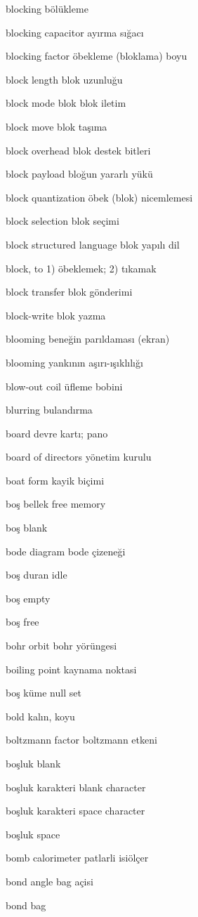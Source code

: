 \documentclass[12pt,fleqn]{article}\usepackage{../../common}
\begin{document}
blocking bölükleme

blocking capacitor ayırma sığacı

blocking factor öbekleme (bloklama) boyu

block length blok uzunluğu

block mode blok blok iletim

block move blok taşıma

block overhead blok destek bitleri

block payload bloğun yararlı yükü

block quantization öbek (blok) nicemlemesi

block selection blok seçimi

block structured language blok yapılı dil

block, to 1) öbeklemek; 2) tıkamak

block transfer blok gönderimi

block-write blok yazma

blooming beneğin parıldaması (ekran)

blooming yankının aşırı-ışıklılığı

blow-out coil üfleme bobini

blurring bulandırma

board devre kartı; pano

board of directors yönetim kurulu

boat form kayik biçimi

boş bellek free memory

boş blank

bode diagram bode çizeneği

boş duran idle

boş empty

boş free

bohr orbit bohr yörüngesi

boiling point kaynama noktasi

boş küme null set

bold kalın, koyu

boltzmann factor boltzmann etkeni

boşluk blank

boşluk karakteri blank character

boşluk karakteri space character

boşluk space

bomb calorimeter patlarli isiölçer

bond angle bag açisi

bond bag
\end{document}

